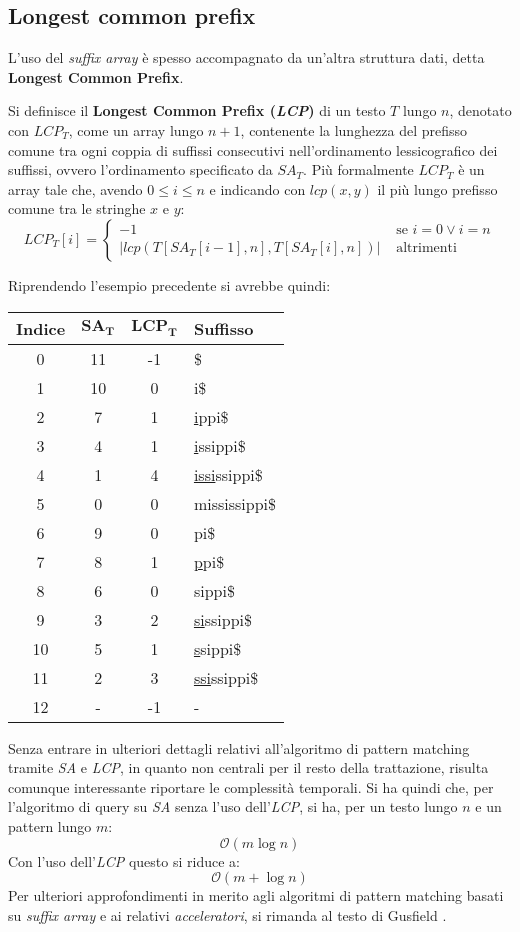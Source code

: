 \subsection{Longest common prefix}
L'uso del \textit{suffix array} è spesso accompagnato da un'altra struttura
dati, detta \textbf{Longest Common Prefix}.
\begin{definizione}
  Si definisce il \textbf{Longest Common Prefix (\emph{LCP})} di un testo $T$
  lungo $n$,
  denotato con $LCP_T$, come un array lungo $n+1$, contenente la
  lunghezza del prefisso comune tra ogni coppia di suffissi consecutivi
  nell'ordinamento lessicografico dei suffissi, ovvero l'ordinamento specificato
  da $SA_T$. Più formalmente
  $LCP_T$ è un array tale che, avendo $0\leq i\leq n$ e indicando con $lcp(x,y)$
  il più lungo prefisso comune tra le stringhe $x$ e $y$:
  \[LCP_T[i]=
    \begin{cases}
      -1&\mbox{ se } i=0 \lor i=n\\
      \left|lcp(T[SA_T[i-1], n],T[SA_T [i], n])\right|&\mbox{ altrimenti}
    \end{cases}
  \]
\end{definizione}
\begin{esempio}
  Riprendendo l'esempio precedente si avrebbe quindi:
  \begin{table}[H]
    \centering
    \footnotesize
    \begin{tabular}{c|c|c|l} 
      \textbf{Indice} & $\mathbf{SA_T}$ & $\mathbf{LCP_T}$ & \textbf{Suffisso}\\ 
      \hline
      0 & 11 & -1 & \$\\
      1 & 10 & 0 & i\$\\
      2 & 7 & 1 & \underline{i}ppi\$\\
      3 & 4 & 1 & \underline{i}ssippi\$\\
      4 & 1 & 4 & \underline{issi}ssippi\$\\
      5 & 0 & 0 & mississippi\$\\
      6 & 9 & 0 & pi\$\\
      7 & 8 & 1 & \underline{p}pi\$\\
      8 & 6 & 0 & sippi\$\\
      9 & 3 & 2 & \underline{si}ssippi\$\\
      10 & 5 & 1 & \underline{s}sippi\$\\
      11 & 2 & 3 & \underline{ssi}ssippi\$\\
      12 & - & -1 & -
    \end{tabular}
  \end{table}
\end{esempio}
Senza entrare in ulteriori dettagli relativi all'algoritmo di pattern matching
tramite \textit{SA} e \textit{LCP}, in quanto non centrali per il resto della
trattazione, risulta comunque interessante riportare le complessità
temporali. Si ha quindi che, per l'algoritmo di query su \textit{SA} senza l'uso
dell'\textit{LCP}, si ha, per un testo lungo $n$ e un pattern lungo $m$:
\[\mathcal{O}(m\log n)\]
Con l'uso dell'\textit{LCP} questo si riduce a:
\[\mathcal{O}(m+\log n)\]
Per ulteriori approfondimenti in merito agli algoritmi di pattern matching
basati su \textit{suffix array} e ai relativi \textit{acceleratori}, si rimanda
al testo di Gusfield \cite{gusfield1997}.
